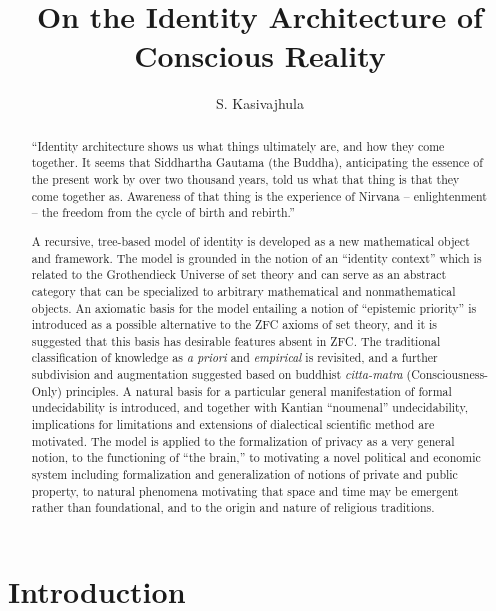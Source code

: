 \documentclass[pra,twocolumn,groupedaddress,10pt]{revtex4}
\theoremstyle{definition}
\begin{document}
\title{On the Identity Architecture of Conscious Reality}
\author{S. Kasivajhula}
{}

\begin{abstract}

``Identity architecture shows us what things ultimately are, and how they come together. It seems that Siddhartha Gautama (the Buddha), anticipating the essence of the present work by over two thousand years, told us what that thing is that they come together as. Awareness of that thing is the experience of Nirvana -- enlightenment -- the freedom from the cycle of birth and rebirth.''

A recursive, tree-based model of identity is developed as a new mathematical object and framework. The model is grounded in the notion of an ``identity context'' which is related to the Grothendieck Universe of set theory and can serve as an abstract category that can be specialized to arbitrary mathematical and nonmathematical objects. An axiomatic basis for the model entailing a notion of ``epistemic priority'' is introduced as a possible alternative to the ZFC axioms of set theory, and it is suggested that this basis has desirable features absent in ZFC. The traditional classification of knowledge as \emph{a priori} and \emph{empirical} is revisited, and a further subdivision and augmentation suggested based on buddhist \emph{citta-matra} (Consciousness-Only) principles. A natural basis for a particular general manifestation of formal undecidability is introduced, and together with Kantian ``noumenal'' undecidability, implications for limitations and extensions of dialectical scientific method are motivated. The model is applied to the formalization of privacy as a very general notion, to the functioning of ``the brain,'' to motivating a novel political and economic system including formalization and generalization of notions of private and public property, to natural phenomena motivating that space and time may be emergent rather than foundational, and to the origin and nature of religious traditions.

\end{abstract}

\maketitle

\tableofcontents

\section{Introduction} \label{sec:introduction}
\end{document}
